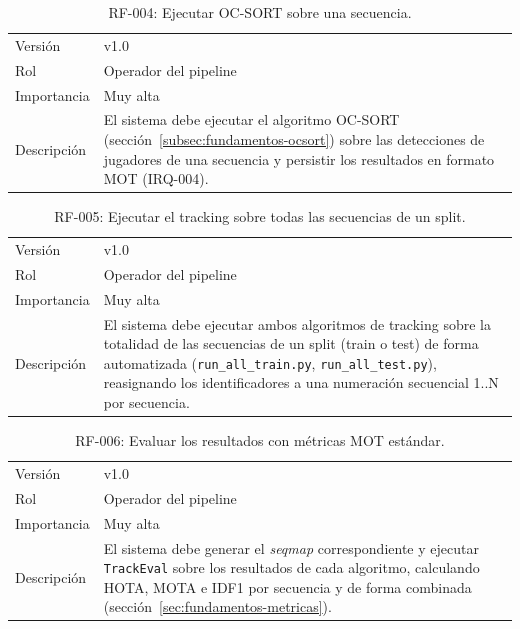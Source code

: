 \begin{table}[htp]
\centering
\caption{RF-004: Ejecutar OC-SORT sobre una secuencia.}
\label{tab:rf-004}
\renewcommand{\arraystretch}{1.2}
\begin{tabular}{|p{3.1cm}|p{9.2cm}|}
\hline
\rowcolor{gray!25}
\multicolumn{2}{|l|}{\textbf{RF-004 -- Ejecutar OC-SORT sobre una secuencia}} \\
\hline
Versión & v1.0 \\
\hline
Rol & Operador del pipeline \\
\hline
Importancia & Muy alta \\
\hline
Descripción & El sistema debe ejecutar el algoritmo OC-SORT
  (sección~\ref{subsec:fundamentos-ocsort}) sobre las detecciones de
  jugadores de una secuencia y persistir los resultados en formato MOT
  (IRQ-004). \\
\hline
\end{tabular}
\end{table}

\begin{table}[htp]
\centering
\caption{RF-005: Ejecutar el tracking sobre todas las secuencias de un split.}
\label{tab:rf-005}
\renewcommand{\arraystretch}{1.2}
\begin{tabular}{|p{3.1cm}|p{9.2cm}|}
\hline
\rowcolor{gray!25}
\multicolumn{2}{|l|}{\textbf{RF-005 -- Ejecutar el tracking sobre todas las secuencias de un split}} \\
\hline
Versión & v1.0 \\
\hline
Rol & Operador del pipeline \\
\hline
Importancia & Muy alta \\
\hline
Descripción & El sistema debe ejecutar ambos algoritmos de tracking sobre
  la totalidad de las secuencias de un split (train o test) de forma
  automatizada (\texttt{run\_all\_train.py}, \texttt{run\_all\_test.py}),
  reasignando los identificadores a una numeración secuencial 1..N por
  secuencia. \\
\hline
\end{tabular}
\end{table}

\begin{table}[htp]
\centering
\caption{RF-006: Evaluar los resultados con métricas MOT estándar.}
\label{tab:rf-006}
\renewcommand{\arraystretch}{1.2}
\begin{tabular}{|p{3.1cm}|p{9.2cm}|}
\hline
\rowcolor{gray!25}
\multicolumn{2}{|l|}{\textbf{RF-006 -- Evaluar los resultados con métricas MOT estándar}} \\
\hline
Versión & v1.0 \\
\hline
Rol & Operador del pipeline \\
\hline
Importancia & Muy alta \\
\hline
Descripción & El sistema debe generar el \emph{seqmap} correspondiente y
  ejecutar \texttt{TrackEval} sobre los resultados de cada algoritmo,
  calculando HOTA, MOTA e IDF1 por secuencia y de forma combinada
  (sección~\ref{sec:fundamentos-metricas}). \\
\hline
\end{tabular}
\end{table}

